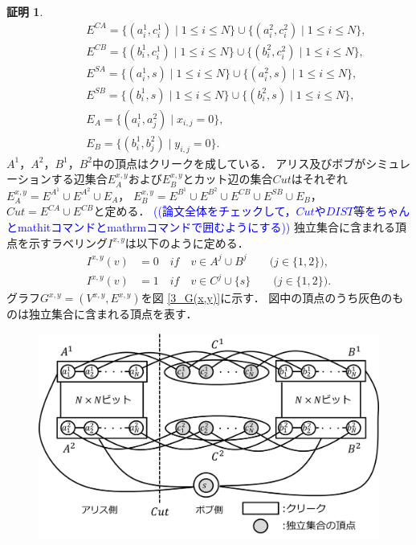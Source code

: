 \documentclass[12pt]{thesis}
\newcommand{\Izumi}[1]{\textcolor{blue}{(#1)}}
\theoremstyle{definition}
\newtheorem*{prf*}{証明}
\begin{document}
\begin{prf*}
\begin{align*}
&\phantom{=} \quad E^{CA} = \{(a^{1}_{i}, c^{1}_{i}) \mid 1\leq i \leq N\} \cup \{(a^{2}_{i}, c^{2}_{i}) \mid 1\leq i \leq N\}, \\
&\phantom{=} \quad E^{CB} = \{(b^{1}_{i}, c^{1}_{i}) \mid 1\leq i \leq N\} \cup \{(b^{2}_{i}, c^{2}_{i}) \mid 1\leq i \leq N\}, \\
&\phantom{=} \quad E^{SA} = \{(a^{1}_{i}, s) \mid 1\leq i \leq N\} \cup \{(a^{2}_{i}, s) \mid 1\leq i \leq N\}, \\
&\phantom{=} \quad E^{SB} = \{(b^{1}_{i}, s) \mid 1\leq i \leq N\} \cup \{(b^{2}_{i}, s) \mid 1\leq i \leq N\}, \\
&\phantom{=} \quad E_{A} = \{(a^{1}_{i},a^{2}_{j}) \mid x_{i,j}=0\}, \\
&\phantom{=} \quad E_{B} = \{(b^{1}_{i},b^{2}_{j}) \mid y_{i,j}=0\}.
\end{align*}
$A^{1}$，$A^{2}$，$B^{1}$，$B^{2}$中の頂点はクリークを成している．
アリス及びボブがシミュレーションする辺集合$E^{x,y}_A$および$E^{x,y}_B$とカット辺の集合$Cut$はそれぞれ
$E^{x,y}_{A} = E^{A^{1}} \cup E^{A^{2}} \cup E_{A}$，
$E^{x,y}_{B} = E^{B^{1}} \cup E^{B^{2}} \cup E^{CB} \cup E^{SB} \cup E_{B}$，
$Cut = E^{CA} \cup E^{CB}$と定める．
\Izumi{(論文全体をチェックして，$Cut$や$DIST$等をちゃんとmathitコマンドとmathrmコマンドで囲むようにする)}
独立集合に含まれる頂点を示すラベリング$I^{x,y}$は以下のように定める．
\begin{align*}
I^{x,y}(v) &= 0 \quad if \quad v \in A^{j} \cup B^{j} \quad \quad \text{($j \in \{1, 2\}$)}, \\
I^{x,y}(v) &= 1 \quad if \quad v \in C^{j} \cup \{s\} \quad \quad \text{($j \in \{1, 2\}$)}.
\end{align*}
グラフ$G^{x, y} = (V^{x,y}, E^{x,y})$を図 \ref{3_G(x,y)}に示す．
図中の頂点のうち灰色のものは独立集合に含まれる頂点を表す．
\begin{figure}[ht]
\begin{center}
\includegraphics[width=120mm]{3_Gxy.png}

\end{center}
\end{figure}
\end{prf*}
\end{document}
